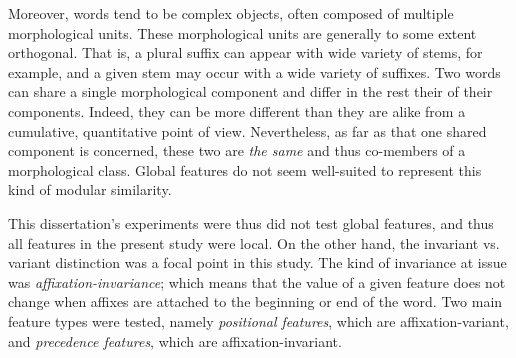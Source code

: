 Moreover, words tend to be complex objects, often composed of multiple morphological units.
These morphological units are generally to some extent orthogonal. That is, a
plural suffix can appear with wide variety of stems, for example, and a given stem may occur with a wide variety of suffixes.
Two words can share a single morphological component and differ in the rest their of their components. Indeed,
they can be more different than they are alike from a cumulative, quantitative point of view. Nevertheless,
as far as that one shared component is concerned, these two are \emph{the same} and thus co-members of a morphological
class. Global features do not seem well-suited to represent this kind of modular similarity. 

This dissertation's experiments were thus did not test global features, and thus all features in the present study were local.
On the other hand, the invariant vs. variant distinction was a focal point in this study.
The kind of invariance at issue was \emph{affixation-invariance}; which means that the value of a given feature does not change
when affixes are attached to the beginning or end of the word. 
Two main feature types were tested, namely \emph{positional features}, which are affixation-variant, 
and \emph{precedence features}, which are affixation-invariant.


